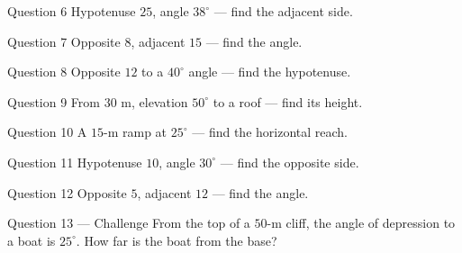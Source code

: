 \documentclass[11pt]{article}
\begin{document}
\begin{qbox}{Question 6}
Hypotenuse $25$, angle $38^\circ$ — find the adjacent side.\workspace{2.4cm}
\end{qbox}

\begin{qbox}{Question 7}
Opposite $8$, adjacent $15$ — find the angle.\workspace{2.4cm}
\end{qbox}

\begin{qbox}{Question 8}
Opposite $12$ to a $40^\circ$ angle — find the hypotenuse.\workspace{2.4cm}
\end{qbox}

\begin{qbox}{Question 9}
From $30$ m, elevation $50^\circ$ to a roof — find its height.\workspace{2.4cm}
\end{qbox}

\begin{qbox}{Question 10}
A $15$-m ramp at $25^\circ$ — find the horizontal reach.\workspace{2.4cm}
\end{qbox}

\begin{qbox}{Question 11}
Hypotenuse $10$, angle $30^\circ$ — find the opposite side.\workspace{2.4cm}
\end{qbox}

\begin{qbox}{Question 12}
Opposite $5$, adjacent $12$ — find the angle.\workspace{2.4cm}
\end{qbox}

\begin{qbox}{Question 13 --- Challenge}
From the top of a $50$-m cliff, the angle of depression to a boat is $25^\circ$. How far is the boat from the base?\workspace{3.2cm}
\end{qbox}

\clearpage
{}
\end{document}
